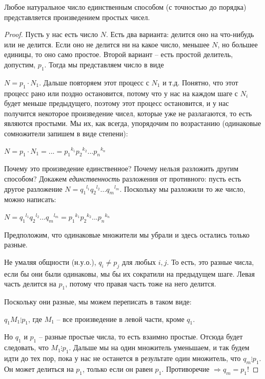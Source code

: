 \documentclass[russian]{lecture-notes}
\begin{document}
	\begin{theorem*} 
		 Любое натуральное число единственным способом (с точностью до порядка) представляется произведением простых чисел.
	\end{theorem*}
	\begin{proof}
		
		Пусть у нас есть число $N$. Есть два варианта: делится оно на что-нибудь или не делится. Если оно не делится ни на какое число, меньшее $N$, но большее единицы, то оно само простое. Второй вариант -- есть простой делитель, допустим, $p_1$. Тогда мы представляем число в виде 
		
		$N = p_1 \cdot N_1$. Дальше повторяем этот процесс с $N_1$ и т.д.
		Понятно, что этот процесс рано или поздно остановится, потому что у нас на каждом шаге с $N_i$ будет  меньше предыдущего, поэтому этот процесс остановится, и у нас получится некоторое произведение чисел, которые уже не разлагаются, то есть являются простыми. Мы их, как всегда, упорядочим по возрастанию (одинаковые сомножители запишем в виде степени):
		
		$N = p_1 \cdot N_1 = ... = {p_1}^{k_1} {p_2}^{k_2} ... {p_n}^{k_n}$
		
		Почему это произведение единственное? Почему нельзя разложить другим способом? Докажем \textit{единственность} разложения от противного: пусть есть другое разложение $N = {q_1}^{l_1} {q_2}^{l_2} ... {q_m}^{l_m}$. Поскольку мы разложили то же число, можно написать:
		
		$N = {q_1}^{l_1} {q_2}^{l_2} ... {q_m}^{l_m} = {p_1}^{k_1} {p_2}^{k_2} ... {p_n}^{k_n}$
		
		Предположим, что одинаковые множители мы убрали и здесь остались только разные. 
		
		Не умаляя общности (н.у.о.), $q_i \neq p_j$ для любых $i, j$. То есть, это разные числа,  если бы они были одинаковы, мы бы их сократили на предыдущем шаге. Левая часть делится на $p_1$, потому что правая часть тоже на него делится. 
		
		Поскольку они разные, мы можем переписать в таком виде:
		
		$q_1 M_1 \vdots p_1$, где $M_1$ -- все произведение в левой части, кроме $q_1$.
		
		Но $q_1$ и $p_1$ -- разные простые числа, то есть взаимно простые. Отсюда будет следовать, что $M_1 \vdots p_1$. Дальше мы на один множитель уменьшаем, и так будем идти до тех пор, пока у нас не останется в результате один множитель, что $q_m \vdots p_1$. Он может делиться на $p_1$, только если он равен $p_1$. Противоречие $\Rightarrow q_m = p_1$!
	\end{proof}
\end{document}

